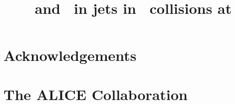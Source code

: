 


\linenumbers

%

\begin{titlepage}
%
%

\title{\lda\ and \ks\ in jets in \pPb\ collisions at }


\begin{abstract}

\end{abstract}
\end{titlepage}
\setcounter{page}{2}

%
%
%
%

\newenvironment{acknowledgement}{\relax}{\relax}
\begin{acknowledgement}
\section*{Acknowledgements}
\end{acknowledgement}



\newpage
\appendix
%
%
\section{The ALICE Collaboration}
\label{app:collab}

